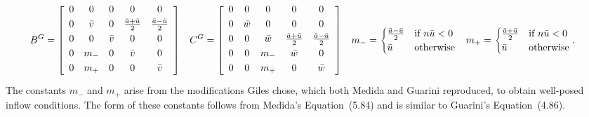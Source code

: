 \begin{subequations}
\label{eq:medidabgcg}
\begin{align}
\label{eq:dimeulerapproxmedidaopt1}
  B^G &= \left[\begin{array}{ccccc}
    0 & 0       & 0       & 0                           & 0                         \\ \noalign{\smallskip}
    0 & \bar{v} & 0       & \frac{\bar{a} + \bar{u}}{2} & \frac{\bar{a}-\bar{u}}{2} \\ \noalign{\smallskip}
    0 & 0       & \bar{v} & 0                           & 0                         \\ \noalign{\smallskip}
    0 & m_{-}   & 0       & \bar{v}                     & 0                         \\ \noalign{\smallskip}
    0 & m_{+}   & 0       & 0                           & \bar{v}                   \\ \noalign{\smallskip}
  \end{array}\right]
&
  C^G &= \left[\begin{array}{ccccc}
    0 & 0       & 0       & 0                         & 0                         \\ \noalign{\smallskip}
    0 & \bar{w} & 0       & 0                         & 0                         \\ \noalign{\smallskip}
    0 & 0       & \bar{w} & \frac{\bar{a}+\bar{u}}{2} & \frac{\bar{a}-\bar{u}}{2} \\ \noalign{\smallskip}
    0 & 0       & m_{-}   & \bar{w}                   & 0                         \\ \noalign{\smallskip}
    0 & 0       & m_{+}   & 0                         & \bar{w}                   \\ \noalign{\smallskip}
  \end{array}\right]
\end{align}
\begin{align}
    m_{-} &= \begin{cases} \frac{\bar{a}-\bar{u}}{2} &\text{if $n\bar{u}<0$} \\ \bar{u} &\text{otherwise} \end{cases}
&
    m_{+} &= \begin{cases} \frac{\bar{a}+\bar{u}}{2} &\text{if $n\bar{u}<0$} \\ \bar{u} &\text{otherwise} \end{cases}.
\end{align}
\end{subequations}
The constants $m_{-}$ and $m_{+}$ arise from the modifications Giles chose,
which both Medida and Guarini reproduced, to obtain well-posed inflow
conditions.  The form of these constants follows from Medida's Equation~(5.84)
and is similar to Guarini's Equation~(4.86).

